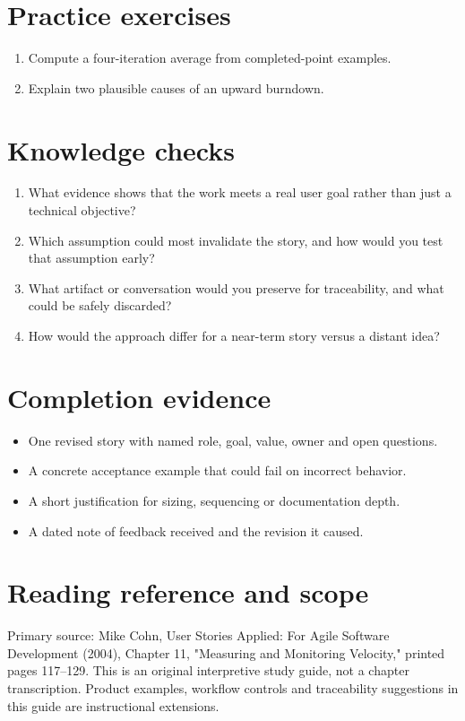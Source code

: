 \documentclass[11pt,letterpaper]{article}
\begin{document}
\section{Practice exercises}
\begin{enumerate}[leftmargin=*,itemsep=3pt]
\item Compute a four-iteration average from completed-point examples.
\item Explain two plausible causes of an upward burndown.
\end{enumerate}
\section{Knowledge checks}
\begin{enumerate}[leftmargin=*,itemsep=3pt]
\item What evidence shows that the work meets a real user goal rather than just a technical objective?
\item Which assumption could most invalidate the story, and how would you test that assumption early?
\item What artifact or conversation would you preserve for traceability, and what could be safely discarded?
\item How would the approach differ for a near-term story versus a distant idea?
\end{enumerate}
\section{Completion evidence}
\begin{itemize}[leftmargin=*,itemsep=2pt]
\item One revised story with named role, goal, value, owner and open questions.
\item A concrete acceptance example that could fail on incorrect behavior.
\item A short justification for sizing, sequencing or documentation depth.
\item A dated note of feedback received and the revision it caused.
\end{itemize}
\section{Reading reference and scope}
Primary source: Mike Cohn, User Stories Applied: For Agile Software Development (2004), Chapter 11, "Measuring and Monitoring Velocity," printed pages 117–129. This is an original interpretive study guide, not a chapter transcription. Product examples, workflow controls and traceability suggestions in this guide are instructional extensions.
\end{document}
